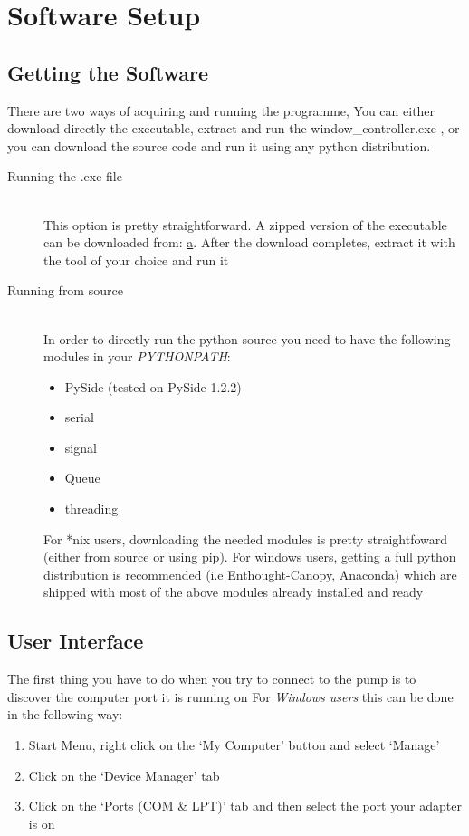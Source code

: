 \documentclass[a4paper]{article}
\begin{document}
\section{Software Setup}
\subsection{Getting the Software}
There are two ways of acquiring and running the programme,
You can either download directly the executable, extract and run the window\_controller.exe
, or you can download the source code and run it using any python distribution.

\begin{description}
    \item[Running the .exe file] \hfill\\
        This option is pretty straightforward. A zipped version of the executable 
        can be downloaded from: \url{a}.%
        After the download completes, extract it with the tool of your choice and 
        run it
    \item[Running from source] \hfill\\
        In order to directly run the python source you need to have the following modules
        in your \textit{PYTHONPATH}:
        \begin{itemize}
            \item PySide (tested on PySide 1.2.2)
            \item serial
            \item signal
            \item Queue
            \item threading
        \end{itemize}
        For *nix users, downloading the needed modules 
        is pretty straightfoward (either from source or using pip). 
        For windows users, getting a full python distribution is recommended (i.e \href{https://www.enthought.com/}{Enthought-Canopy}, \href{http://www.continuum.io/}{Anaconda})
        which are shipped with most of the above modules already installed and ready
\end{description}

\subsection{User Interface}
The first thing you have to do when you try to connect to the pump is to discover the computer port it is running on
For \emph{Windows users} this can be done in the following way:
\begin{enumerate}
\item Start Menu, right click on the `My Computer' button and select `Manage'
\item Click on the `Device Manager' tab
\item Click on the `Ports (COM \& LPT)' tab and then select the port your adapter is on
\end{enumerate}
\end{document}
